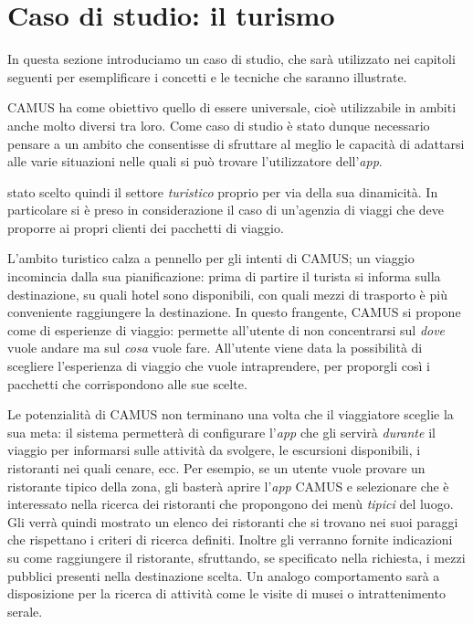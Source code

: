 \section{Caso di studio: il turismo\label{sec:caso-studio-turismo}}

In questa sezione introduciamo un caso di studio, che sarà utilizzato nei capitoli seguenti per esemplificare i concetti e le tecniche che saranno illustrate. 

CAMUS ha come obiettivo quello di essere universale, cioè utilizzabile in ambiti anche molto diversi tra loro. Come caso di studio è stato dunque necessario pensare a un ambito che consentisse di sfruttare al meglio le capacità di adattarsi alle varie situazioni nelle quali si può trovare l'utilizzatore dell'\emph{app}.

\upe stato scelto quindi il settore \emph{turistico} proprio per via della sua dinamicità. In particolare si è preso in considerazione il caso di un'agenzia di viaggi che deve proporre ai propri clienti dei pacchetti di viaggio.

L'ambito turistico calza a pennello per gli intenti di CAMUS; un viaggio incomincia dalla sua pianificazione: prima di partire il turista si informa sulla destinazione, su quali hotel sono disponibili, con quali mezzi di trasporto è più conveniente raggiungere la destinazione. In questo frangente, CAMUS si propone come  di esperienze di viaggio: permette all'utente di non concentrarsi sul \emph{dove} vuole andare ma sul \emph{cosa} vuole fare. All'utente viene data la possibilità di scegliere l'esperienza di viaggio che vuole intraprendere, per proporgli così i pacchetti che corrispondono alle sue scelte.

Le potenzialità di CAMUS non terminano una volta che il viaggiatore sceglie la sua meta: il sistema permetterà di configurare l'\emph{app} che gli servirà \emph{durante} il viaggio per informarsi sulle attività da svolgere, le escursioni disponibili, i ristoranti nei quali cenare, ecc. Per esempio, se un utente vuole provare un ristorante tipico della zona, gli basterà aprire l'\emph{app} CAMUS e selezionare che è interessato nella ricerca dei ristoranti che propongono dei menù \emph{tipici} del luogo. Gli verrà quindi mostrato un elenco dei ristoranti che si trovano nei suoi paraggi che rispettano i criteri di ricerca definiti. Inoltre gli verranno fornite indicazioni su come raggiungere il ristorante, sfruttando, se specificato nella richiesta, i mezzi pubblici presenti nella destinazione scelta. Un analogo comportamento sarà a disposizione per la ricerca di attività come le visite di musei o intrattenimento serale.

